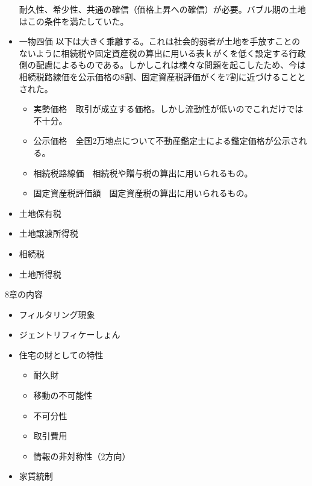 \documentclass{jsarticle}
\begin{document}
\begin{itemize}
耐久性、希少性、共通の確信（価格上昇への確信）が必要。バブル期の土地はこの条件を満たしていた。
\item 一物四価
以下は大きく乖離する。これは社会的弱者が土地を手放すことのないように相続税や固定資産税の算出に用いる表ｋがくを低く設定する行政側の配慮によるものである。しかしこれは様々な問題を起こしたため、今は相続税路線価を公示価格の8割、固定資産税評価がくを7割に近づけることとされた。
	\begin{itemize}
	\item 実勢価格　取引が成立する価格。しかし流動性が低いのでこれだけでは不十分。
	\item 公示価格　全国2万地点について不動産鑑定士による鑑定価格が公示される。
	\item 相続税路線価　相続税や贈与税の算出に用いられるもの。
	\item 固定資産税評価額　固定資産税の算出に用いられるもの。
	\end{itemize}
\item 土地保有税
\item 土地譲渡所得税
\item 相続税
\item 土地所得税
\end{itemize}

8章の内容
\begin{itemize}
\item フィルタリング現象
\item ジェントリフィケーしょん
\item 住宅の財としての特性
	\begin{itemize}
	\item 耐久財
	\item 移動の不可能性
	\item 不可分性
	\item 取引費用
	\item 情報の非対称性（2方向）
	\end{itemize}
\item 家賃統制
\end{itemize}
\end{document}
